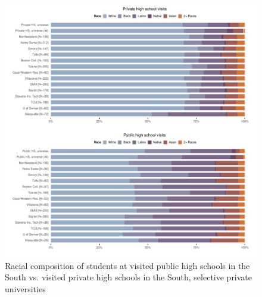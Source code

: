 \documentclass[
  12pt,
]{article}
\begin{document}
\begin{landscape}
\begin{figure}
{\centering \includegraphics[width=2\linewidth]{./south_race_comp_privu_privhs_pubhs} 

}

\caption{Racial composition of students at visited public high schools in the South vs. visited private high schools in the South, selective private universities}\label{fig:south-race-comp-privu-privhs-pubhs}
\end{figure}

\end{landscape}

\restoregeometry
\end{document}
